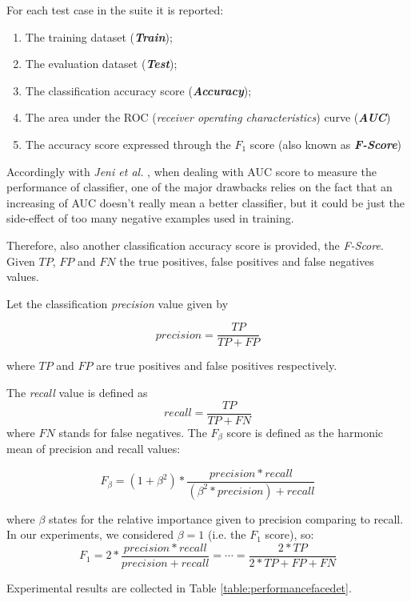 For each test case in the suite it is reported:
\begin{enumerate}
\item The training dataset (\textbf{\emph{Train}});
\item The evaluation dataset (\textbf{\emph{Test}});
\item The classification accuracy score (\textbf{\emph{Accuracy}});
\item The area under the ROC (\emph{receiver operating characteristics}) curve (\textbf{\emph{AUC}})
\item The accuracy score expressed through the $F_1$ score (also known as \textbf{\emph{F-Score}})
\end{enumerate}

Accordingly with \emph{Jeni et al.} \cite{jeni2013facing}, when dealing with AUC score to measure the performance of classifier, one of the major drawbacks relies on the fact that an increasing of AUC doesn't really mean a better classifier, but it could be just the side-effect of too many negative examples used in training.

Therefore, also another classification accuracy score is provided, the \emph{F-Score}. Given $TP$, $FP$ and $FN$ the true positives, false positives and false negatives values. 

Let the classification \emph{precision} value given by

$$
precision = \frac{TP}{TP + FP}
$$

where $TP$ and $FP$ are true positives and false positives respectively.

The \emph{recall} value is defined as
$$
recall = \frac{TP}{TP + FN}
$$
where $FN$ stands for false negatives. The $F_{\beta}$ score is defined as the harmonic mean of precision and recall values:

\begin{equation}
F_{\beta} = (1 + \beta^2) * \frac{precision * recall}{(\beta^2 * precision) + recall}
\end{equation}

where $\beta$ states for the relative importance given to precision comparing to recall. In our experiments, we considered $\beta = 1$ (i.e. the $F_1$ score), so:
\begin{equation}
F_{1} = 2 * \frac{precision * recall}{precision + recall}  = \cdots = \frac{2 * TP}{2 * TP + FP + FN}
\end{equation}

Experimental results are collected in Table \ref{table:performancefacedet}. 


